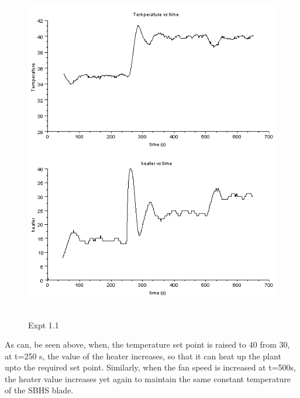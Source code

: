 \begin{figure}[H]
  \includegraphics[width=12cm, height=15cm]{mpc/1_1_heater_final.png}
  \caption{Expt 1.1}
\end{figure}
As can, be seen above, when, the temperature set point is raised to 40 from 30, at t=250 s, the value of the heater increases, so that it can heat up the plant upto the required set point. Similarly, when the fan speed is increased at t=500s, the heater value increases yet again to maintain the same constant temperature of the SBHS blade. 


